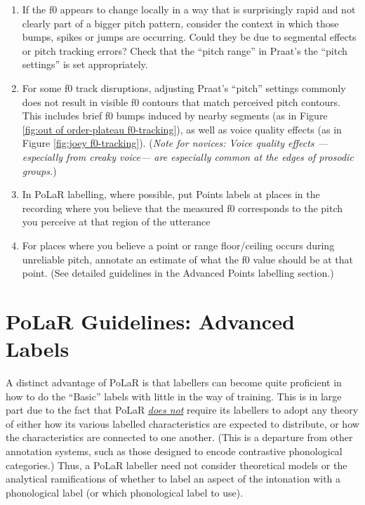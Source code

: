 \documentclass[11pt, twoside]{memoir}
\begin{document}
\begin{enumerate} \def\labelenumi{\arabic{enumi}.}
\item If the f0 appears to change locally in a way that is surprisingly rapid and not clearly part of a bigger pitch pattern, consider the context in which those bumps, spikes or jumps are occurring. Could they be due to segmental effects or pitch tracking errors? Check that the “pitch range” in Praat's the “pitch settings” is set appropriately.
\item For some f0 track disruptions, adjusting Praat’s “pitch” settings commonly does not result in visible f0 contours that match perceived pitch contours. This includes brief f0 bumps induced by nearby segments (as in Figure \ref{fig:out of order-plateau f0-tracking}), as well as voice quality effects (as in Figure \ref{fig:joey f0-tracking}). (\textit{Note for novices: Voice quality effects —especially from creaky voice— are especially common at the edges of prosodic groups.})
\item In PoLaR labelling, where possible, put Points labels at places in the recording where you believe that the measured f0 corresponds to the pitch you perceive at that region of the utterance
\item For places where you believe a point or range floor\slash ceiling occurs during unreliable pitch, annotate an estimate of what the f0 value should be at that point. (See detailed guidelines in the Advanced Points labelling section.)
\end{enumerate}




\chapter{PoLaR Guidelines: Advanced Labels}\label{ch:advanced}

A distinct advantage of PoLaR is that labellers can become quite proficient in how to do the “Basic” labels with little in the way of training. This is in large part due to the fact that PoLaR \textit{\uline{does not}} require its labellers to adopt any theory of either how its various labelled characteristics are expected to distribute, or how the characteristics are connected to one another. (This is a departure from other annotation systems, such as those designed to encode contrastive phonological categories.) Thus, a PoLaR labeller need not consider theoretical models or the analytical ramifications of whether to label an aspect of the intonation with a phonological label (or which phonological label to use).
\end{document}
